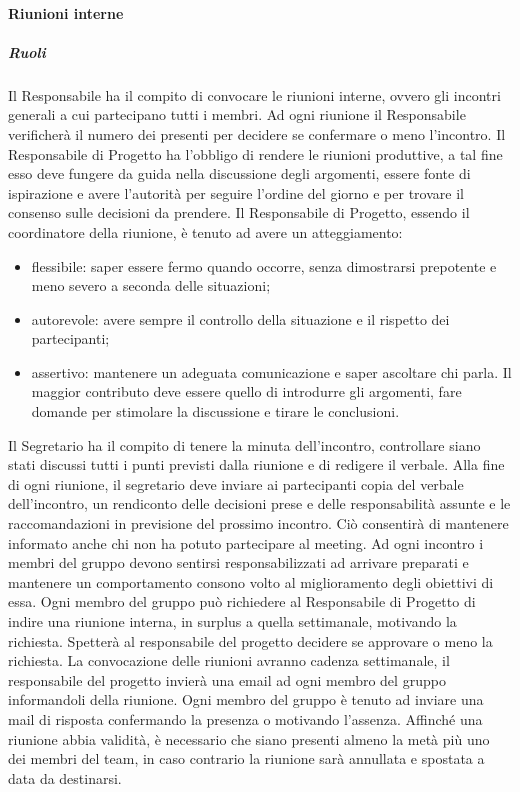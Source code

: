\paragraph{Riunioni interne}
\subparagraph{Ruoli}
Il Responsabile ha il compito di convocare le riunioni interne, ovvero gli incontri generali a cui partecipano tutti i membri.
Ad ogni riunione il Responsabile verificherà il numero dei presenti per decidere se confermare o meno l'incontro.
Il Responsabile di Progetto ha l'obbligo di rendere le riunioni produttive, a tal fine 
esso deve fungere da guida nella discussione degli argomenti, essere fonte di ispirazione e avere l'autorità per seguire l'ordine del giorno e per trovare il consenso sulle decisioni da prendere.
Il Responsabile di Progetto, essendo il coordinatore della riunione, è tenuto ad avere un atteggiamento:
\begin{itemize}
\item
flessibile: saper essere fermo quando occorre, senza dimostrarsi prepotente e meno severo a seconda delle situazioni;
\item
autorevole: avere sempre il controllo della situazione e il rispetto dei partecipanti;
\item
assertivo: mantenere un adeguata comunicazione e saper ascoltare chi parla. Il maggior contributo deve essere quello di introdurre gli argomenti, fare domande per stimolare la discussione e tirare le conclusioni.
\end{itemize}
Il Segretario ha il compito di tenere la minuta dell'incontro, controllare siano stati discussi tutti i punti previsti dalla riunione e di redigere
il verbale. Alla fine di ogni riunione, il segretario deve inviare ai partecipanti copia del verbale dell'incontro, un rendiconto delle decisioni prese e delle responsabilità assunte e le raccomandazioni in previsione del prossimo incontro. Ciò consentirà di mantenere informato anche chi non ha potuto partecipare al meeting. 
Ad ogni incontro i membri del gruppo devono sentirsi responsabilizzati ad arrivare preparati e mantenere un comportamento consono volto al miglioramento degli obiettivi di essa.
Ogni membro del gruppo può richiedere al Responsabile di Progetto di indire una riunione interna, in surplus a quella settimanale, motivando la richiesta. Spetterà al responsabile del progetto decidere se approvare o meno la richiesta.
La convocazione delle riunioni avranno cadenza settimanale, il responsabile del progetto invierà una email ad ogni membro del gruppo informandoli della riunione.
Ogni membro del gruppo è tenuto ad inviare una mail di risposta confermando la presenza o motivando l'assenza.
Affinché una riunione abbia validità, è necessario che siano presenti almeno la metà più uno dei membri del team, in caso contrario la riunione sarà annullata e spostata a data da destinarsi.

